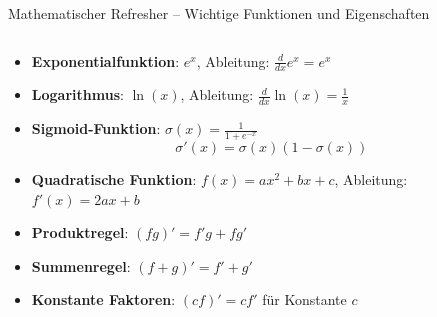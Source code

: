 \documentclass[aspectratio=1610, xcolor=dvipsnames, 9pt]{beamer}
\begin{document}
\begin{frame}{Mathematischer Refresher -- Wichtige Funktionen und Eigenschaften}
  \begin{columns}
    \begin{column}{1\textwidth}
      \begin{itemize}
        \item \textbf{Exponentialfunktion}: $e^x$, Ableitung: $\frac{d}{dx} e^x = e^x$
        \item \textbf{Logarithmus}: $\ln(x)$, Ableitung: $\frac{d}{dx} \ln(x) = \frac{1}{x}$
        \item \textbf{Sigmoid-Funktion}: $\sigma(x) = \frac{1}{1 + e^{-x}}$
        \begin{equation}
          \sigma'(x) = \sigma(x)(1 - \sigma(x))
        \end{equation}
        \item \textbf{Quadratische Funktion}: $f(x) = ax^2 + bx + c$, Ableitung: $f'(x) = 2ax + b$
        \item \textbf{Produktregel}: $(fg)' = f'g + fg'$
        \item \textbf{Summenregel}: $(f + g)' = f' + g'$
        \item \textbf{Konstante Faktoren}: $(cf)' = cf'$ für Konstante $c$
      \end{itemize}
    \end{column}
  \end{columns}
\end{frame}
\end{document}
